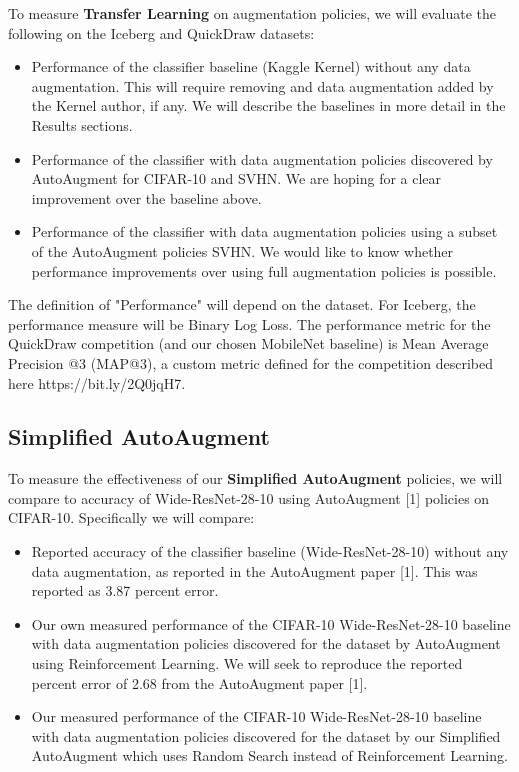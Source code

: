 \documentclass[10pt,twocolumn,letterpaper]{article}
\begin{document}
To measure \textbf{Transfer Learning} on augmentation policies, we will evaluate the following on the Iceberg and QuickDraw datasets:

\begin{itemize}
  \item Performance of the classifier baseline (Kaggle Kernel) without any data augmentation.  This will require removing and data augmentation added by the Kernel author, if any.  We will describe the baselines in more detail in the Results sections.
  \item Performance of the classifier with data augmentation policies discovered by AutoAugment for CIFAR-10 and SVHN.  We are hoping for a clear improvement over the baseline above.
  \item Performance of the classifier with data augmentation policies using a subset of the AutoAugment policies SVHN.  We would like to know whether performance improvements over using full augmentation policies is possible.
\end{itemize}

The definition of "Performance" will depend on the dataset.  For Iceberg, the performance measure will be Binary Log Loss.  The performance metric for the QuickDraw competition (and our chosen MobileNet baseline) is Mean Average Precision @3 (MAP@3), a custom metric defined for the competition described here https://bit.ly/2Q0jqH7.

\subsection{Simplified AutoAugment}

To measure the effectiveness of our \textbf{Simplified AutoAugment} policies, we will compare to accuracy of Wide-ResNet-28-10 using AutoAugment [1] policies on CIFAR-10.  Specifically we will compare:

\begin{itemize}
  \item Reported accuracy of the classifier baseline (Wide-ResNet-28-10) without any data augmentation, as reported in the AutoAugment paper [1].  This was reported as 3.87 percent error.
  \item Our own measured performance of the CIFAR-10 Wide-ResNet-28-10 baseline with data augmentation policies discovered for the dataset by AutoAugment using Reinforcement Learning.  We will seek to reproduce the reported percent error of 2.68 from the AutoAugment paper [1].
  \item Our measured performance of the  CIFAR-10 Wide-ResNet-28-10 baseline with data augmentation policies discovered for the dataset by our Simplified AutoAugment which uses Random Search instead of Reinforcement Learning.  
\end{itemize}
\end{document}
